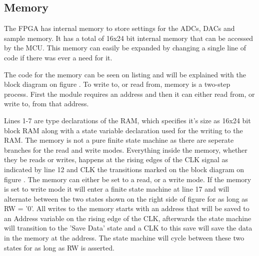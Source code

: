 \subsection{Memory} \label{subsec:Memory}
The FPGA has internal memory to store settings for the ADCs, DACs and sample memory. It has a total of 16x24 bit internal memory that can be accessed by the MCU. This memory can easily be expanded by changing a single line of code if there was ever a need for it.

The code for the memory can be seen on listing  and will be explained with the block diagram on figure . To write to, or read from, memory is a two-step process. First the module requires an address and then it can either read from, or write to, from that address.



Lines 1-7 are type declarations of the RAM, which specifies it's size as 16x24 bit block RAM along with a state variable declaration used for the writing to the RAM. The memory is not a pure finite state machine as there are seperate branches for the read and write modes. Everything inside the memory, whether they be reads or writes, happens at the rising edges of the CLK signal as indicated by line 12 and CLK the transitions marked on the block diagram on figure . The memory can either be set to a read, or a write mode. If the memory is set to write mode it will enter a finite state machine at line 17 and will alternate between the two states shown on the right side of figure  for as long as RW = '0'. All writes to the memory starts with an address that will be saved to an Address variable on the rising edge of the CLK, afterwards the state machine will transition to the 'Save Data' state and a CLK to this save will save the data in the memory at the address. The state machine will cycle between these two states for as long as RW is asserted. 

